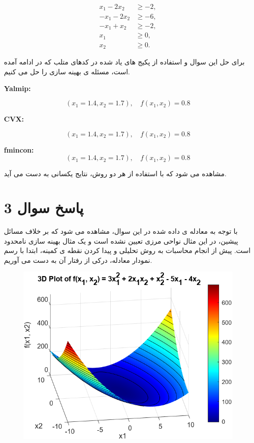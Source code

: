 \begin{align*}
	x_1 - 2x_2 &\geq -2, \\
	-x_1 - 2x_2 &\geq -6, \\
	-x_1 + x_2 &\geq -2, \\
	x_1 &\geq 0, \\
	x_2 &\geq 0.
\end{align*}

برای حل این سوال و استفاده از پکیج های یاد شده
  در کدهای متلب که در ادامه آمده است، مسئله ی بهینه سازی را حل می کنیم.

\textbf{Yalmip:}


\[
(x_1 = 1.4, x_2 = 1.7) , \quad f(x_1, x_2) = 0.8
\]

\textbf{CVX:}



\[
(x_1 = 1.4, x_2 = 1.7) , \quad f(x_1, x_2) = 0.8
\]

\textbf{fmincon:}
\[
(x_1 = 1.4, x_2 = 1.7) , \quad f(x_1, x_2) = 0.8
\]


مشاهده می شود که با استفاده از هر دو روش، نتایج یکسانی به دست می آید.

\section{پاسخ سوال 3}

با توجه به معادله ی داده شده در این سوال، مشاهده می شود که بر خلاف مسائل پیشین، در این مثال نواحی مرزی تعیین نشده است و یک مثال بهینه سازی نامحدود است. پیش از انجام محاسبات به روش تحلیلی و پیدا کردن نقطه ی کمینه، ابتدا با رسم نمودار معادله، درکی از رفتار آن به دست می آوریم.



\begin{figure}[H]
	\centering
	\includegraphics[width=1\linewidth]{../img/Q3_1}
	\caption{}
	\label{fig:q31}
\end{figure}

